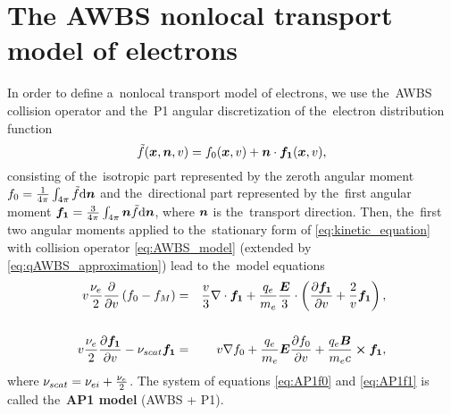 \section{The AWBS nonlocal transport model of electrons}
\label{sec:AWBSnonlocal}

In order to define a~nonlocal transport model of electrons, 
we use the~AWBS collision operator and the~P1 angular 
discretization of the~electron distribution function
\begin{equation}
  \tilde{f}(\boldsymbol{x}, \boldsymbol{n}, v) = 
  f_0(\boldsymbol{x}, v) + \boldsymbol{n}\cdot{\boldsymbol{f_1}}(\boldsymbol{x}, v) , 
  \label{eq:P1approximation}
\end{equation}
consisting of the~isotropic part represented by the zeroth angular moment 
$f_0 = \frac{1}{4\pi}\int_{4\pi} \tilde{f} \text{d}\boldsymbol{n}$ 
and the~directional part represented by the~first angular moment 
${\boldsymbol{f_1}} = \frac{3}{4\pi}\int_{4\pi} \boldsymbol{n}
\tilde{f} \text{d}\boldsymbol{n}$, where $\boldsymbol{n}$ is the~transport direction.
Then, the~first two angular moments
\cite{Shkarofsky_Particle_Kinetics_book_1966_24} applied to the~stationary 
form of 
\eqref{eq:kinetic_equation} with collision operator \eqref{eq:AWBS_model} 
(extended by \eqref{eq:qAWBS_approximation}) lead to the~model equations
\begin{eqnarray}
  v\frac{\nu_{e}}{2}\frac{\partial{}}{\partial{v}}\left(f_0 - f_M \right) &=&
  \frac{v}{3}\nabla\cdot{\boldsymbol{f_1}} + \frac{q_e}{m_e}\frac{\boldsymbol{E}}{3}\cdot\left(
  \frac{\partial{{\boldsymbol{f_1}}}}{\partial{v}} + \frac{2}{v}{\boldsymbol{f_1}}\right) , 
  \nonumber \\
  \label{eq:AP1f0}\\
  v\frac{\nu_{e}}{2}\frac{\partial{{\boldsymbol{f_1}}}}{\partial{v}}
  - \nu_{scat}{\boldsymbol{f_1}} &=& 
  v\nabla f_0 + 
  \frac{q_e}{m_e}\boldsymbol{E}\frac{\partial{f_0}}{\partial{v}} 
  +\frac{q_e\boldsymbol{B}}{m_e c}\boldsymbol{\times} {\boldsymbol{f_1}}
  ,
  \nonumber \\
  \label{eq:AP1f1}
\end{eqnarray}
where $\nu_{scat} = \nu_{ei} + \frac{\nu_{e}}{2}$. The system of equations 
\eqref{eq:AP1f0} and \eqref{eq:AP1f1} is called the~{\bf AP1 model} 
(AWBS + P1).  

